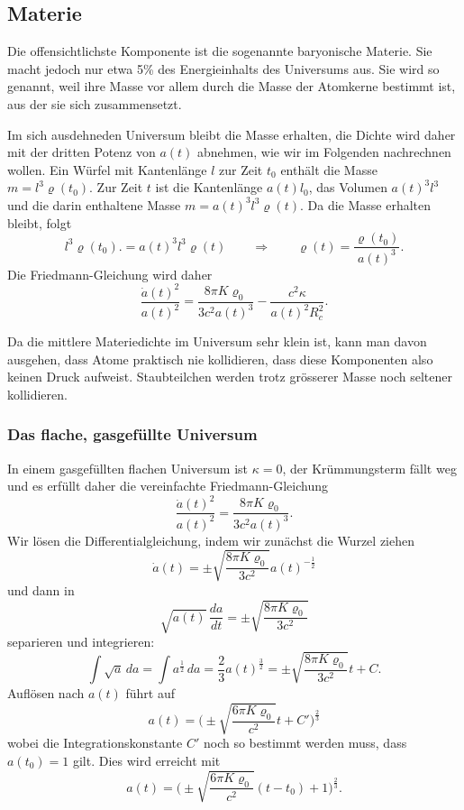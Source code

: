 \subsection{Materie}
Die offensichtlichste Komponente ist die sogenannte baryonische Materie.
Sie macht jedoch nur etwa 5\% des Energieinhalts des Universums aus.
Sie wird so genannt, weil ihre Masse vor allem durch die Masse der Atomkerne
bestimmt ist, aus der sie sich zusammensetzt.

Im sich ausdehneden Universum bleibt die Masse erhalten, die Dichte wird
daher mit der dritten Potenz von $a(t)$ abnehmen, wie wir im Folgenden
nachrechnen wollen.
Ein Würfel mit Kantenlänge $l$ zur Zeit $t_0$ enthält die Masse
$m=l^3 \varrho(t_0)$.
Zur Zeit $t$ ist die Kantenlänge $a(t)l_0$, das Volumen $a(t)^3l^3$
und die darin enthaltene Masse $m=a(t)^3l^3\varrho(t)$.
Da die Masse erhalten bleibt, folgt
\[
l^3 \varrho(t_0).
=
a(t)^3l^3\varrho(t)
\qquad\Rightarrow\qquad
\varrho(t)=\frac{\varrho(t_0)}{a(t)^3}.
\]
Die Friedmann-Gleichung wird daher
\begin{equation}
\frac{\dot a(t)^2}{a(t)^2}
=
\frac{8\pi K\varrho_0}{3c^2a(t)^3}-\frac{c^2\kappa}{a(t)^2R_c^2}.
\end{equation}

Da die mittlere Materiedichte im Universum sehr klein ist, kann man davon
ausgehen, dass Atome praktisch nie kollidieren, dass diese Komponenten
also keinen Druck aufweist.
Staubteilchen werden trotz grösserer Masse noch seltener kollidieren.


\subsubsection{Das flache, gasgefüllte Universum}
In einem gasgefüllten flachen Universum ist $\kappa=0$,
der Krümmungsterm fällt weg und
es erfüllt daher die vereinfachte Friedmann-Gleichung
\[
\frac{\dot a(t)^2}{a(t)^2}
=
\frac{8\pi K\varrho_0}{3c^2 a(t)^3}.
\]
Wir lösen die Differentialgleichung, indem wir zunächst die Wurzel ziehen 
\[
\dot a(t)=\pm \sqrt{
\frac{8\pi K\varrho_0}{3c^2}
}a(t)^{-\frac{1}{2}}
\]
und dann in
\[
\sqrt{a(t)}\,
\frac{da}{dt}
=
\pm\sqrt{\frac{8\pi K\varrho_0}{3c^2}}
\]
separieren und integrieren:
\[
\int \sqrt{a}\,da
=
\int a^\frac12\,da
=
\frac23 a(t)^\frac{3}{2}
=
\pm\sqrt{\frac{8\pi K\varrho_0}{3c^2}}t + C.
\]
Auflösen nach $a(t)$ führt auf
\[
a(t)=\biggl(\pm\sqrt{\frac{6\pi K\varrho_0}{c^2}}t+C'\biggr)^{\frac23}
\]
wobei die Integrationskonstante $C'$ noch so bestimmt werden muss,
dass $a(t_0)=1$ gilt.
Dies wird erreicht mit
\begin{equation}
a(t)
=
\biggl(\pm\sqrt{\frac{6\pi K\varrho_0}{c^2}}(t-t_0) + 1\biggr)^\frac23.
\label{skript:friedmann:alter:materie}
\end{equation}


